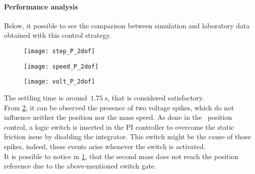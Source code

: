 \paragraph{Performance analysis}
Below, it possible to see the comparison between simulation and laboratory data obtained with this control strategy.
\begin{figure*}[h]
	\centering
	\begin{subfigure}{0.48\columnwidth}
		\texttt{[image: step\_P\_2dof]}
		\label{fig:P_2dof_pos}
	\end{subfigure}
	\begin{subfigure}{0.45\columnwidth}
		\texttt{[image: speed\_P\_2dof]}
	\end{subfigure}
	\begin{subfigure}{0.45\columnwidth}
		\texttt{[image: volt\_P\_2dof]}
		\label{fig:P_2dof_volt}
	\end{subfigure}
	\caption{Position control loop with $k_{p} =2$ with a position step of $\frac{\pi}{4}\ rad$}
\end{figure*}

The settling time is around~$1.75\ s$, that is considered satisfactory. \\
From \cref{fig:P_2dof_volt}, it can be observed the presence of two voltage spikes, which do not influence neither the position nor the mass speed. As done in the \onedof\ position control, a logic switch is inserted in the PI controller to overcome the static friction issue by disabling the integrator. This switch might be the cause of those spikes, indeed, these events arise whenever the switch is activated. \\
It is possible to notice in \cref{fig:P_2dof_pos}, that the second mass does not reach the position reference due to the above-mentioned switch gate.

